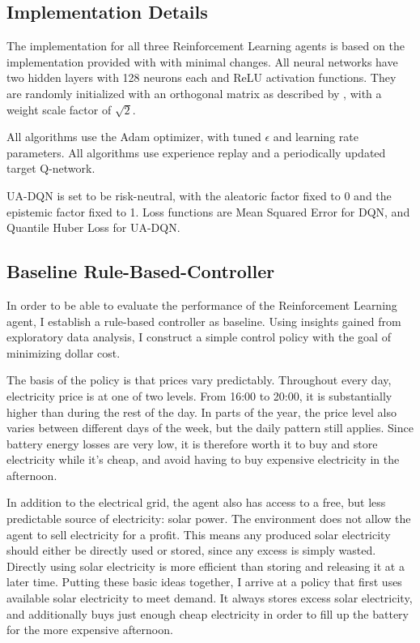 \subsection{Implementation Details}
The implementation for all three Reinforcement Learning agents is based on the implementation provided with \cite{clements2020EstimatingRiskUncertainty} with minimal changes.
All neural networks have two hidden layers with 128 neurons each and ReLU activation functions.
They are randomly initialized with an orthogonal matrix as described by \cite{saxe2014ExactSolutionsNonlinear}, with a weight scale factor of $\sqrt{2}$.

All algorithms use the Adam optimizer, with tuned $\epsilon$ and learning rate parameters.
All algorithms use experience replay and a periodically updated target Q-network.

UA-DQN is set to be risk-neutral, with the aleatoric factor fixed to 0 and the epistemic factor fixed to 1.
Loss functions are Mean Squared Error for DQN, and Quantile Huber Loss for UA-DQN.

\subsection{Baseline Rule-Based-Controller}
In order to be able to evaluate the performance of the Reinforcement Learning agent, I establish a rule-based controller as baseline.
Using insights gained from exploratory data analysis, I construct a simple control policy with the goal of minimizing dollar cost.

The basis of the policy is that prices vary predictably.
Throughout every day, electricity price is at one of two levels.
From 16:00 to 20:00, it is substantially higher than during the rest of the day.
In parts of the year, the price level also varies between different days of the week, but the daily pattern still applies.
Since battery energy losses are very low, it is therefore worth it to buy and store electricity while it's cheap, and avoid having to buy expensive electricity in the afternoon.

In addition to the electrical grid, the agent also has access to a free, but less predictable source of electricity: solar power.
The environment does not allow the agent to sell electricity for a profit.
This means any produced solar electricity should either be directly used or stored, since any excess is simply wasted. Directly using solar electricity is more efficient than storing and releasing it at a later time.
Putting these basic ideas together, I arrive at a policy that first uses available solar electricity to meet demand.
It always stores excess solar electricity, and additionally buys just enough cheap electricity in order to fill up the battery for the more expensive afternoon.

